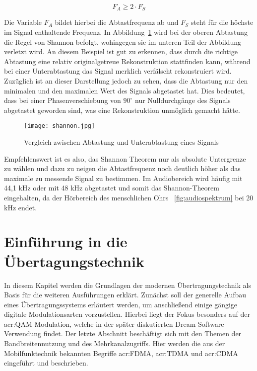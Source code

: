 \begin{equation}
	\label{equ:abtast}
	F_{A} \geq 2 \cdot F_{S}
\end{equation}

Die Variable $F_{A}$ bildet hierbei die Abtastfrequenz ab und $F_{S}$ steht für die höchste im Signal enthaltende Frequenz. In Abbildung~\ref{fig:shannon} wird bei der oberen Abtastung die Regel von Shannon befolgt, wohingegen sie im unteren Teil der Abbildung verletzt wird. An diesem Beispiel ist gut zu erkennen, dass durch die richtige Abtastung eine relativ originalgetreue Rekonstruktion stattfinden kann, während bei einer Unterabtastung das Signal merklich verfälscht rekonstruiert wird. Zuzüglich ist an dieser Darstellung jedoch zu sehen, dass die Abtastung nur den minimalen und den maximalen Wert des Signals abgetastet hat. Dies bedeutet, dass bei einer Phasenverschiebung von $90^\circ$ nur Nulldurchgänge des Signals abgetastet geworden sind, was eine Rekonstruktion unmöglich gemacht hätte. 

\begin{figure}[H]
	\centering
	\texttt{[image: shannon.jpg]}
	\caption[Vergleich zwischen Abtastung und Unterabtastung eines Signals]{Vergleich zwischen Abtastung und Unterabtastung eines Signals} \cite{stotzaudio}
	\label{fig:shannon}
\end{figure}

Empfehlenswert ist es also, das Shannon Theorem nur als absolute Untergrenze zu wählen und dazu zu neigen die Abtastfrequenz noch deutlich höher als das maximale zu messende Signal zu bestimmen.\cite{stotzaudio} Im Audiobereich wird häufig mit 44,1 kHz oder mit 48 kHz abgetastet und somit das Shannon-Theorem eingehalten, da der Hörbereich des menschlichen Ohrs ~\ref{fig:audiospektrum} bei 20 kHz endet. \cite{masteraudio}


\section{Einführung in die Übertagungstechnik}
\label{subsec:uebertragung}
In diesem Kapitel werden die Grundlagen der modernen Übertragungstechnik als Basis für die weiteren Ausführungen erklärt. Zunächst soll der generelle Aufbau eines Übertragungssystems erläutert werden, um anschließend einige gängige digitale Modulationsarten vorzustellen. Hierbei liegt der Fokus besonders auf der \gls{acr:QAM}-Modulation, welche in der später diskutierten Dream-Software Verwendung findet. Der letzte Abschnitt beschäftigt sich mit den Themen der Bandbreitennutzung und des Mehrkanalzugriffs. Hier werden die aus der Mobilfunktechnik bekannten Begriffe \gls{acr:FDMA}, \gls{acr:TDMA} und \gls{acr:CDMA} eingeführt und beschrieben.

